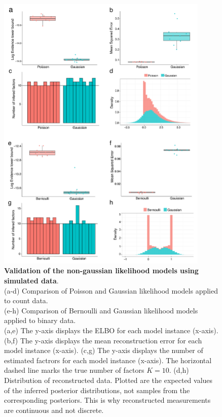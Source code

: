\begin{figure}[H]
	\centering 	
	\includegraphics[width=0.9\textwidth]{MOFA_nongaussian}
	\caption{\textbf{Validation of the non-gaussian likelihood models using simulated data}.\\
	(a-d) Comparison of Poisson and Gaussian likelihood models applied to count data.\\
	(e-h) Comparison of Bernoulli and Gaussian likelihood models applied to binary data.\\
	(a,e) The y-axis displays the ELBO for each model instance (x-axis). (b,f) The y-axis displays the mean reconstruction error for each model instance (x-axis). (c,g) The y-axis displays the number of estimated factrors for each model instance (x-axis). The horizontal dashed line marks the true number of factors $K=10$. (d,h) Distribution of reconstructed data. Plotted are the expected values of the inferred posterior distributions, not samples from the corresponding posteriors. This is why reconstructed measurements are continuous and not discrete.
	}
	\label{fig:MOFA_nongaussian}
\end{figure}


